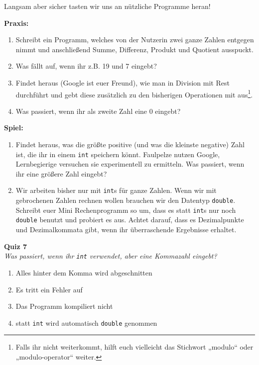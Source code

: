
Langsam aber sicher tasten wir uns an nützliche Programme heran!

\textbf{Praxis:}
\begin{enumerate}[resume]
    \item Schreibt ein Programm, welches von der Nutzerin zwei ganze Zahlen
        entgegen nimmt und anschließend Summe, Differenz, Produkt und Quotient
        ausspuckt.
    \item Was fällt auf, wenn ihr z.B. 19 und 7 eingebt?
	\item Findet heraus (Google ist euer Freund), wie man in \Cpp Division mit
		Rest durchführt und gebt diese zusätzlich zu den bisherigen Operationen
		mit aus\footnote{Falls ihr nicht weiterkommt, hilft euch vielleicht das
		Stichwort „modulo“ oder „modulo-operator“ weiter.}.
    \item Was passiert, wenn ihr als zweite Zahl eine 0 eingebt?
\end{enumerate}

\textbf{Spiel:}
\begin{enumerate}
    \item Findet heraus, was die größte positive (und was die kleinste
        negative) Zahl ist, die ihr in einem \texttt{int} speichern könnt.
        Faulpelze nutzen Google, Lernbegierige versuchen sie experimentell zu
        ermitteln. Was passiert, wenn ihr eine größere Zahl eingebt?
    \item Wir arbeiten bisher nur mit \texttt{int}s für ganze Zahlen. Wenn wir
        mit gebrochenen Zahlen rechnen wollen brauchen wir den Datentyp
        \texttt{double}. Schreibt euer Mini Rechenprogramm so um, dass es statt
        \texttt{int}s nur noch \texttt{double} benutzt und probiert es aus.
        Achtet darauf, dass es Dezimalpunkte und Dezimalkommata gibt, wenn ihr
        überraschende Ergebnisse erhaltet.
\end{enumerate}

\textbf{Quiz 7}\\
\textit{Was passiert, wenn ihr \texttt{int} verwendet, aber eine Kommazahl eingebt?}
\begin{enumerate}[label=\alph]
    \item Alles hinter dem Komma wird abgeschnitten
    \item Es tritt ein Fehler auf
    \item Das Programm kompiliert nicht
    \item statt \texttt{int} wird automatisch \texttt{double} genommen
\end{enumerate}

